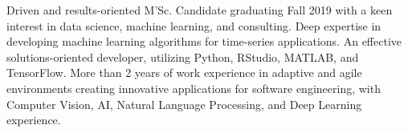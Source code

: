 

\begin{cvparagraph}

Driven and results-oriented M'Sc. Candidate graduating Fall 2019 with a keen interest in data science, machine learning, and consulting. Deep expertise in developing machine learning algorithms for time-series applications. An effective solutions-oriented developer, utilizing Python, RStudio, MATLAB, and TensorFlow. More than 2 years of work experience in adaptive and agile environments creating innovative applications for software engineering, with Computer Vision, AI, Natural Language Processing, and Deep Learning experience.
\end{cvparagraph}
